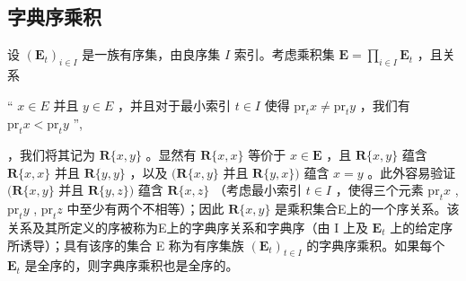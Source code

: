 \subsection{字典序乘积}

设 \((\mathbf{E}_t)_{i\in I}\) 是一族有序集，由良序集 \(I\) 索引。考虑乘积集 \(\mathbf{E} = \prod_{i\in I}\mathbf{E}_t\) ，且关系

`` \(x \in E\) 并且 \(y \in E\) ，并且对于最小索引 \(t \in I\) 使得 \(\mathrm{pr}_t x \neq \mathrm{pr}_t y\) ，我们有 \(\mathrm{pr}_t x < \mathrm{pr}_t y\) '',

，我们将其记为 \(\mathbf{R}\{x, y\}\) 。显然有 \(\mathbf{R}\{x, x\}\) 等价于 \(x \in \mathbf{E}\) ，且 \(\mathbf{R}\{x, y\}\) 蕴含 \(\mathbf{R}\{x, x\}\) 并且 \(\mathbf{R}\{y, y\}\) ，以及 \((\mathbf{R}\{x, y\}\) 并且 \(\mathbf{R}\{y, x\})\) 蕴含 \(x = y\) 。此外容易验证 \((\mathbf{R}\{x, y\}\) 并且 \(\mathbf{R}\{y, z\})\) 蕴含 \(\mathbf{R}\{x, z\}\) （考虑最小索引 \(t \in I\) ，使得三个元素 \(\mathrm{pr}_t x\) , \(\mathrm{pr}_t y\) , \(\mathrm{pr}_t z\) 中至少有两个不相等）；因此 \(\mathbf{R}\{x, y\}\) 是乘积集合E上的一个序关系。该关系及其所定义的序被称为E上的字典序关系和字典序（由 I 上及 \(\mathbf{E}_t\) 上的给定序所诱导）；具有该序的集合 E 称为有序集族 \((\mathbf{E}_t)_{t \in I}\) 的字典序乘积。如果每个 \(\mathbf{E}_t\) 是全序的，则字典序乘积也是全序的。

